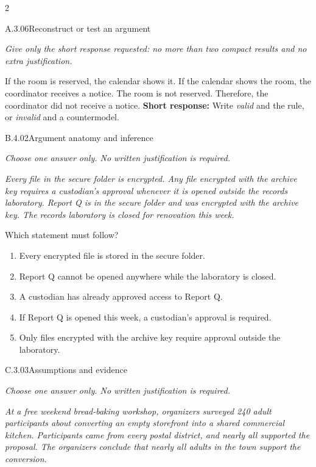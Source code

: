 \documentclass[9pt]{extarticle}
\newcommand{\choice}[1]{\item #1}
\begin{document}
\begin{multicols}{2}
\begin{DenseCoreProblem}{A.3.06}{Reconstruct or test an argument}
{\scriptsize\textit{Give only the short response requested: no more than two compact results and no extra justification.}\par}
If the room is reserved, the calendar shows it. If the calendar shows the room, the coordinator receives a notice. The room is not reserved. Therefore, the coordinator did not receive a notice.
\textbf{Short response:} Write \emph{valid} and the rule, or \emph{invalid} and a countermodel.
\end{DenseCoreProblem}
\begin{DenseCoreProblem}{B.4.02}{Argument anatomy and inference}
{\scriptsize\textit{Choose one answer only. No written justification is required.}\par}
\emph{Every file in the secure folder is encrypted. Any file encrypted with the archive key requires a custodian's approval whenever it is opened outside the records laboratory. Report Q is in the secure folder and was encrypted with the archive key. The records laboratory is closed for renovation this week.}

Which statement must follow?
\begin{enumerate}[label=(\alph*)]
  \choice{Every encrypted file is stored in the secure folder.}
  \choice{Report Q cannot be opened anywhere while the laboratory is closed.}
  \choice{A custodian has already approved access to Report Q.}
  \choice{If Report Q is opened this week, a custodian's approval is required.}
  \choice{Only files encrypted with the archive key require approval outside the laboratory.}
\end{enumerate}
\end{DenseCoreProblem}
\columnbreak
\begin{DenseCoreProblem}{C.3.03}{Assumptions and evidence}
{\scriptsize\textit{Choose one answer only. No written justification is required.}\par}
\emph{At a free weekend bread-baking workshop, organizers surveyed 240 adult participants about converting an empty storefront into a shared commercial kitchen. Participants came from every postal district, and nearly all supported the proposal. The organizers conclude that nearly all adults in the town support the conversion.}


\end{DenseCoreProblem}
\end{multicols}
\end{document}

